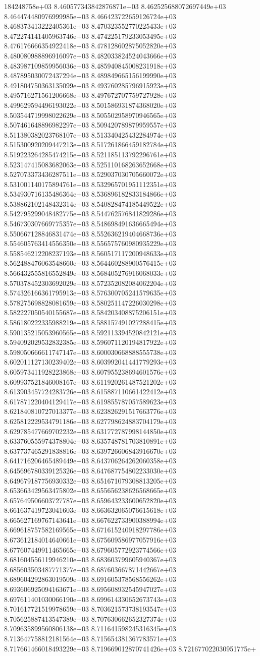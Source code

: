 184248758e+03	8.460577343842876871e+03	8.462525688072697449e+03	8.464474480976999985e+03	8.466423722659126724e+03	8.468373413222405361e+03	8.470323552770225433e+03	8.472274141405963746e+03	8.474225179233053495e+03	8.476176666354922418e+03	8.478128602875052820e+03	8.480080988896916097e+03	8.482033824524043666e+03	8.483987109859956036e+03	8.485940845008231918e+03	8.487895030072437294e+03	8.489849665156199990e+03	8.491804750363135099e+03	8.493760285796915923e+03	8.495716271561206668e+03	8.497672707759727928e+03	8.499629594496193022e+03	8.501586931874368020e+03	8.503544719998022629e+03	8.505502958970946565e+03	8.507461648896982297e+03	8.509420789879959557e+03	8.511380382023768107e+03	8.513340425432284974e+03	8.515300920209447213e+03	8.517261866459182784e+03	8.519223264285474215e+03	8.521185113792296761e+03	8.523147415083682063e+03	8.525110168263652668e+03	8.527073373436287511e+03	8.529037030705660072e+03	8.531001140175894761e+03	8.532965701951112351e+03	8.534930716135486364e+03	8.536896182833184866e+03	8.538862102148432314e+03	8.540828474185449522e+03	8.542795299048482775e+03	8.544762576841829286e+03	8.546730307669775357e+03	8.548698491636665494e+03	8.550667128846831474e+03	8.552636219404668736e+03	8.554605763414556350e+03	8.556575760980935229e+03	8.558546212208237193e+03	8.560517117200948633e+03	8.562488476063548660e+03	8.564460288900576415e+03	8.566432555816552849e+03	8.568405276916068033e+03	8.570378452303692029e+03	8.572352082084062204e+03	8.574326166361795913e+03	8.576300705241579635e+03	8.578275698828081659e+03	8.580251147226030298e+03	8.582227050540155687e+03	8.584203408875206151e+03	8.586180222335988219e+03	8.588157491027288415e+03	8.590135215053960565e+03	8.592113394520842121e+03	8.594092029532832385e+03	8.596071120194817922e+03	8.598050666611747147e+03	8.600030668888555738e+03	8.602011127130239402e+03	8.603992041441779293e+03	8.605973411928223868e+03	8.607955238694601576e+03	8.609937521846008167e+03	8.611920261487521202e+03	8.613903457724283726e+03	8.615887110661422412e+03	8.617871220404129417e+03	8.619855787057589623e+03	8.621840810727013377e+03	8.623826291517663776e+03	8.625812229534791186e+03	8.627798624883704179e+03	8.629785477669702232e+03	8.631772787998144850e+03	8.633760555974378804e+03	8.635748781703810891e+03	8.637737465291838816e+03	8.639726606843916670e+03	8.641716206465489449e+03	8.643706264262060358e+03	8.645696780339125326e+03	8.647687754802233030e+03	8.649679187756930332e+03	8.651671079308813205e+03	8.653663429563475802e+03	8.655656238626568665e+03	8.657649506603727787e+03	8.659643233600652820e+03	8.661637419723041603e+03	8.663632065076615618e+03	8.665627169767143641e+03	8.667622733900388994e+03	8.669618757582169565e+03	8.671615240918297786e+03	8.673612184014640661e+03	8.675609586977057916e+03	8.677607449911465665e+03	8.679605772923774566e+03	8.681604556119946210e+03	8.683603799605940367e+03	8.685603503487771377e+03	8.687603667871442667e+03	8.689604292863019509e+03	8.691605378568556262e+03	8.693606925094163671e+03	8.695608932545947027e+03	8.697611401030066190e+03	8.699614330652673743e+03	8.701617721519978659e+03	8.703621573738193547e+03	8.705625887413547389e+03	8.707630662652327374e+03	8.709635899560806138e+03	8.711641598245316345e+03	8.713647758812181564e+03	8.715654381367783571e+03	8.717661466018493229e+03	8.719669012870741426e+03	8.721677022030951775e+